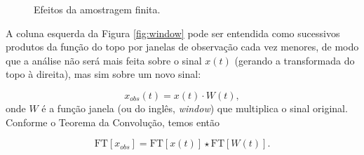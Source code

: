 \begin{figure}[ht!]
	\caption{Efeitos da amostragem finita.}
	\vspace{1mm}	%
	\begin{center}
	\end{center}
	\vspace{1mm}	%
	\label{fig:adaptado}
\end{figure}


A coluna esquerda da Figura \ref{fig:window} pode ser entendida como sucessivos produtos da função do topo por janelas de observação cada vez menores, de modo que a análise não será mais feita sobre o sinal $x(t)$ (gerando a transformada do topo à direita), mas sim sobre um novo sinal:

\begin{equation}
x_{obs}(t) = x(t) \cdot W(t),
\label{eq:xobs}
\end{equation}
onde $W$ é a função janela (ou do inglês, \textit{window}) que multiplica o sinal original. Conforme o Teorema da Convolução, temos então

\begin{equation}
\text{FT}[x_{obs}] = \text{FT}[x(t)] \star \text{FT}[W(t)].
\end{equation}

